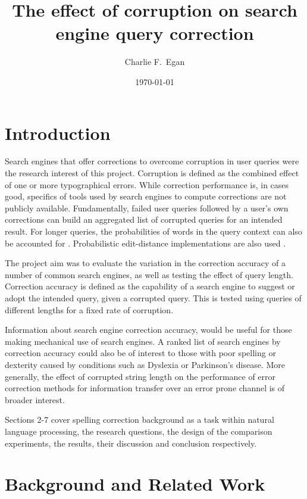 \documentclass{csfourzero}
\title{The effect of corruption on search engine query correction}
\author{Charlie F.\ Egan}
\date{\today}
\begin{document}
\maketitle

\section{Introduction}
\label{sec:intro}

Search engines that offer corrections to overcome corruption in user queries were the research interest of this project. Corruption is defined as the combined effect of one or more typographical errors. While correction performance is, in cases good, specifics of tools used by search engines to compute corrections are not publicly available. Fundamentally, failed user queries followed by a user's own corrections can build an aggregated list of corrupted queries for an intended result. For longer queries, the probabilities of words in the query context can also be accounted for \cite{noampatent}. Probabilistic edit-distance implementations are also used \cite{howtospellcorrector}.

The project aim was to evaluate the variation in the correction accuracy of a number of common search engines, as well as testing the effect of query length. Correction accuracy is defined as the capability of a search engine to suggest or adopt the intended query, given a corrupted query. This is tested using queries of different lengths for a fixed rate of corruption.

Information about search engine correction accuracy, would be useful for those making mechanical use of search engines. A ranked list of search engines by correction accuracy could also be of interest to those with poor spelling or dexterity caused by conditions such as Dyslexia or Parkinson's disease. More generally, the effect of corrupted string length on the performance of error correction methods for information transfer over an error prone channel is of broader interest.

Sections 2-7 cover spelling correction background as a task within natural language processing, the research questions, the design of the comparison experiments, the results, their discussion and conclusion respectively.

\section{Background and Related Work}
\label{sec:lit}
\end{document}
